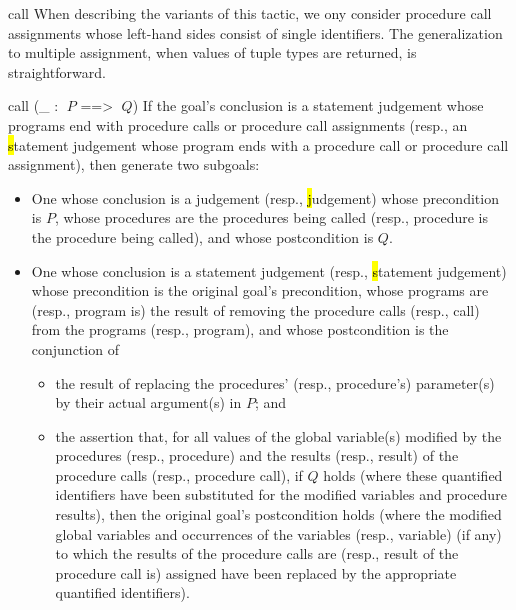 \begin{tactic}{call}
  When describing the variants of this tactic, we ony consider
  procedure call assignments whose left-hand sides consist of single
  identifiers.  The generalization to multiple assignment, when values
  of tuple types are returned, is straightforward.

  \bigskip
  \begin{tsyntax}{call (_ : $\;P$ ==> $\;Q$)}
    If the goal's conclusion is a \prhl statement judgement whose
    programs end with procedure calls or procedure call assignments
    (resp., an \hl statement judgement whose program ends with a
    procedure call or procedure call assignment), then generate two
    subgoals:
  \begin{itemize}
  \item One whose conclusion is a \prhl judgement (resp., \hl
    judgement) whose precondition is $P$, whose procedures are the
    procedures being called (resp., procedure is the procedure being
    called), and whose postcondition is $Q$.

  \item One whose conclusion is a \prhl statement judgement (resp.,
    \hl statement judgement) whose precondition is the original goal's
    precondition, whose programs are (resp., program is) the result of
    removing the procedure calls (resp., call) from the programs
    (resp., program), and whose postcondition is the conjunction of
    \begin{itemize}
    \item the result of replacing the procedures' (resp., procedure's)
      parameter(s) by their actual argument(s) in $P$; and

    \item the assertion that, for all values of the global variable(s)
      modified by the procedures (resp., procedure) and the results
      (resp., result) of the procedure calls (resp., procedure call),
      if $Q$ holds (where these quantified identifiers have been
      substituted for the modified variables and procedure results),
      then the original goal's postcondition holds (where the modified
      global variables and occurrences of the variables (resp.,
      variable) (if any) to which the results of the procedure calls
      are (resp., result of the procedure call is) assigned have been
      replaced by the appropriate quantified identifiers).
    \end{itemize}
  \end{itemize}


\end{tsyntax}
\end{tactic}
